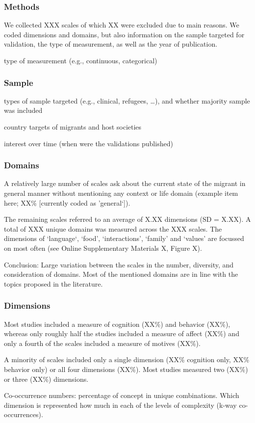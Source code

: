\documentclass[man, 12pt, a4paper]{apa7}
\begin{document}
\subsubsection{Methods}
We collected XXX scales of which XX were excluded due to main reasons. We coded dimensions and domains, but also information on the sample targeted for validation, the type of measurement, as well as the year of publication.

type of measurement (e.g., continuous, categorical)
\subsubsection{Sample}
types of sample targeted (e.g., clinical, refugees, …), and whether majority sample was included

country targets of migrants and host societies

interest over time (when were the validations published)
\subsubsection{Domains}
A relatively large number of scales ask about the current state of the migrant in general manner without mentioning any context or life domain (example item here; XX\% [currently coded as 'general‘]).

The remaining scales referred to an average of X.XX dimensions (SD = X.XX). A total of XXX unique domains was measured across the XXX scales. The dimensions of ‘language‘, ‘food’, ‘interactions’, ‘family’ and ‘values’ are focussed on most often (see Online Supplementary Materials X, Figure X).

Conclusion: Large variation between the scales in the number, diversity, and consideration of domains. Most of the mentioned domains are in line with the topics proposed in the literature.
\subsubsection{Dimensions}
Most studies included a measure of cognition (XX\%) and behavior (XX\%), whereas only roughly half the studies included a measure of affect (XX\%) and only a fourth of the scales included a measure of motives (XX\%).

A minority of scales included only a single dimension (XX\% cognition only, XX\% behavior only) or all four dimensions (XX\%). Most studies measured two (XX\%) or three (XX\%) dimensions.

Co-occurrence numbers: percentage of concept in unique combinations. Which dimension is represented how much in each of the levels of complexity (k-way co-occurrences).
\end{document}
